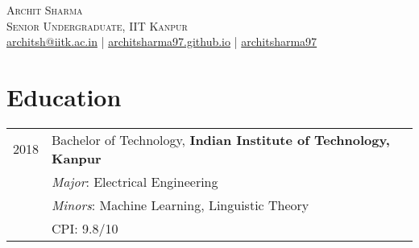 \documentclass[a4paper,10pt]{article}
\begin{document}

\pagestyle{empty} %


\par{\centering
		{\hspace{-2mm}\Huge \textsc{Archit Sharma}
	}\\\large \textsc{Senior Undergraduate, IIT Kanpur}\\\normalsize \Letter\hspace{1mm}\href{mailto:architsh@iitk.ac.in}{architsh@iitk.ac.in} | \Mundus\hspace{1mm}\href{https://architsharma97.github.io/}{ architsharma97.github.io} | \faGithub \hspace{0mm} \href{https://github.com/architsharma97/}{architsharma97} \par}
	
\section{Education}
\begin{tabular}{rl}	
\textsc{2018} & \large Bachelor of Technology, \textbf{Indian Institute of Technology, Kanpur}\\
         & \textit{Major}: Electrical Engineering \\
         & \textit{Minors}: Machine Learning, Linguistic Theory\\
         & {CPI}: \textsc{9.8/10} \\
\end{tabular}
\end{document}
